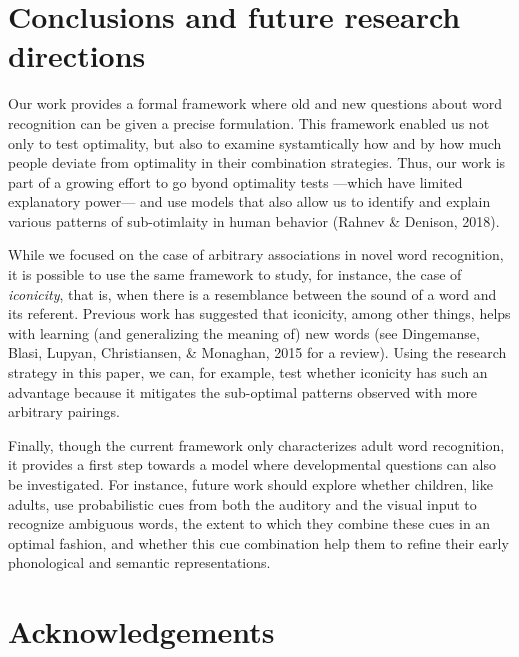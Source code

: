 \documentclass[english,,man,floatsintext]{apa6}
\theoremstyle{definition}
\theoremstyle{definition}
\theoremstyle{definition}
\theoremstyle{remark}
\begin{document}
\section{Conclusions and future research
directions}\label{conclusions-and-future-research-directions}

Our work provides a formal framework where old and new questions about
word recognition can be given a precise formulation. This framework
enabled us not only to test optimality, but also to examine
systamtically how and by how much people deviate from optimality in
their combination strategies. Thus, our work is part of a growing effort
to go byond optimality tests ---which have limited explanatory power---
and use models that also allow us to identify and explain various
patterns of sub-otimlaity in human behavior (Rahnev \& Denison, 2018).

While we focused on the case of arbitrary associations in novel word
recognition, it is possible to use the same framework to study, for
instance, the case of \textit{iconicity}, that is, when there is a
resemblance between the sound of a word and its referent. Previous work
has suggested that iconicity, among other things, helps with learning
(and generalizing the meaning of) new words (see Dingemanse, Blasi,
Lupyan, Christiansen, \& Monaghan, 2015 for a review). Using the
research strategy in this paper, we can, for example, test whether
iconicity has such an advantage because it mitigates the sub-optimal
patterns observed with more arbitrary pairings.

Finally, though the current framework only characterizes adult word
recognition, it provides a first step towards a model where
developmental questions can also be investigated. For instance, future
work should explore whether children, like adults, use probabilistic
cues from both the auditory and the visual input to recognize ambiguous
words, the extent to which they combine these cues in an optimal
fashion, and whether this cue combination help them to refine their
early phonological and semantic representations.

\vspace{1em}

\vspace{1em}

\section{Acknowledgements}\label{acknowledgements}
\end{document}
